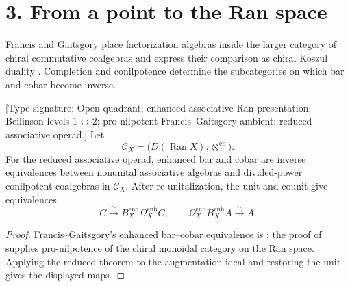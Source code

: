 \section*{3.  From a point to the Ran space}

Francis and Gaitsgory place factorization algebras inside the larger
category of chiral commutative coalgebras and express their comparison
as chiral Koszul duality
\cite{FrancisGaitsgory2012}.  Completion and conilpotence determine
the subcategories on which bar and cobar become inverse.

\begin{theorem}
\label{thm:preface-enhanced-ran-reconstruction}
\textup{[Type signature: Open quadrant; enhanced associative Ran
presentation; Beilinson levels \(1\leftrightarrow2\); pro-nilpotent
Francis--Gaitsgory ambient; reduced associative operad.]}
Let
\[
 \mathcal C_X=\bigl(D(\operatorname{Ran}X),
 \otimes^{\mathrm{ch}}\bigr).
\]
For the reduced associative operad, enhanced bar and cobar are inverse
equivalences between nonunital associative algebras and divided-power
conilpotent coalgebras in \(\mathcal C_X\).  After re-unitalization,
the unit and counit give equivalences
\[
 C\xrightarrow{\ \sim\ }B_X^{\mathrm{enh}}\Omega_X^{\mathrm{enh}}C,
 \qquad
 \Omega_X^{\mathrm{enh}}B_X^{\mathrm{enh}}A
 \xrightarrow{\ \sim\ }A.
\]
\end{theorem}

\begin{proof}
Francis--Gaitsgory's enhanced bar--cobar equivalence is
\cite[Proposition~4.1.2]{Francis2012}; the proof of
\cite[Theorem~5.1.1]{Francis2012} supplies pro-nilpotence of the
chiral monoidal category on the Ran space.  Applying the reduced
theorem to the augmentation ideal and restoring the unit gives the
displayed maps.
\end{proof}

